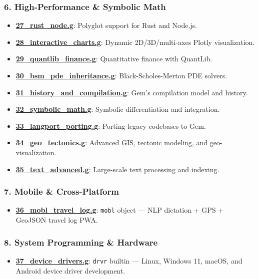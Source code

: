 \documentclass[
]{article}
\providecommand{\tightlist}{%
  \setlength{\itemsep}{0pt}\setlength{\parskip}{0pt}}
\begin{document}
\subsubsection{6. High-Performance \& Symbolic
Math}\label{high-performance-symbolic-math}

\begin{itemize}
\tightlist
\item
  \textbf{\url{27_rust_node.g}}: Polyglot support for Rust and Node.js.
\item
  \textbf{\url{28_interactive_charts.g}}: Dynamic 2D/3D/multi-axes
  Plotly visualization.
\item
  \textbf{\url{29_quantlib_finance.g}}: Quantitative finance with
  QuantLib.
\item
  \textbf{\url{30_bsm_pde_inheritance.g}}: Black-Scholes-Merton PDE
  solvers.
\item
  \textbf{\url{31_history_and_compilation.g}}: Gem's compilation model
  and history.
\item
  \textbf{\url{32_symbolic_math.g}}: Symbolic differentiation and
  integration.
\item
  \textbf{\url{33_langport_porting.g}}: Porting legacy codebases to Gem.
\item
  \textbf{\url{34_geo_tectonics.g}}: Advanced GIS, tectonic modeling,
  and geo-visualization.
\item
  \textbf{\url{35_text_advanced.g}}: Large-scale text processing and
  indexing.
\end{itemize}

\subsubsection{7. Mobile \& Cross-Platform}\label{mobile-cross-platform}

\begin{itemize}
\tightlist
\item
  \textbf{\url{36_mobl_travel_log.g}}: \texttt{mobl} object --- NLP
  dictation + GPS + GeoJSON travel log PWA.
\end{itemize}

\subsubsection{8. System Programming \&
Hardware}\label{system-programming-hardware}

\begin{itemize}
\tightlist
\item
  \textbf{\url{37_device_drivers.g}}: \texttt{drvr} builtin --- Linux,
  Windows 11, macOS, and Android device driver development.
\end{itemize}
\end{document}
